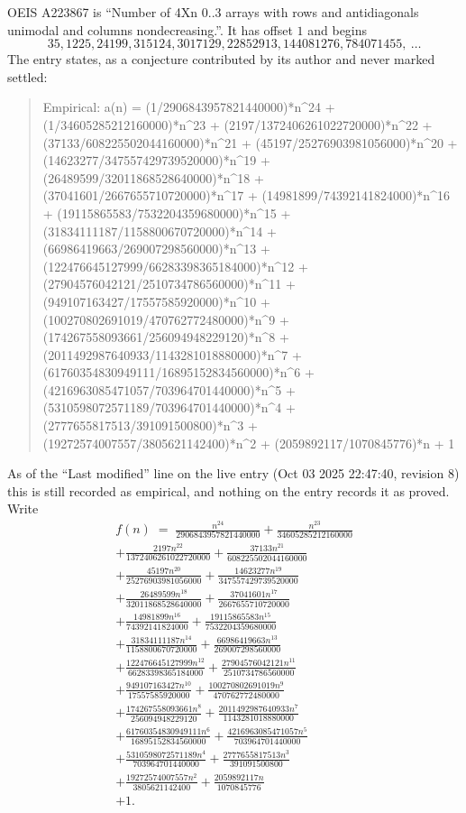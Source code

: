 \documentclass[11pt,a4paper]{article}
\theoremstyle{plain}
\theoremstyle{definition}
\begin{document}
OEIS A223867 is ``Number of 4Xn 0..3 arrays with rows and antidiagonals unimodal and columns nondecreasing.''. It has offset $1$ and begins
\[
35, 1225, 24199, 315124, 3017129, 22852913, 144081276, 784071455,\ \dots
\]
The entry states, as a conjecture contributed by its author and never marked settled:
\begin{quote}\raggedright\small
Empirical: a(n) = (1/2906843957821440000)*n\^{}24 + (1/34605285212160000)*n\^{}23 + (2197/1372406261022720000)*n\^{}22 + (37133/608225502044160000)*n\^{}21 + (45197/25276903981056000)*n\^{}20 + (14623277/347557429739520000)*n\^{}19 + (26489599/32011868528640000)*n\^{}18 + (37041601/2667655710720000)*n\^{}17 + (14981899/74392141824000)*n\^{}16 + (19115865583/7532204359680000)*n\^{}15 + (31834111187/1158800670720000)*n\^{}14 + (66986419663/269007298560000)*n\^{}13 + (122476645127999/66283398365184000)*n\^{}12 + (27904576042121/2510734786560000)*n\^{}11 + (949107163427/17557585920000)*n\^{}10 + (100270802691019/470762772480000)*n\^{}9 + (174267558093661/256094948229120)*n\^{}8 + (2011492987640933/1143281018880000)*n\^{}7 + (61760354830949111/16895152834560000)*n\^{}6 + (4216963085471057/703964701440000)*n\^{}5 + (5310598072571189/703964701440000)*n\^{}4 + (2777655817513/391091500800)*n\^{}3 + (19272574007557/3805621142400)*n\^{}2 + (2059892117/1070845776)*n + 1
\end{quote}
As of the ``Last modified'' line on the live entry (Oct 03 2025 22:47:40, revision 8) this is still
recorded as empirical, and nothing on the entry records it as proved. Write
\begin{multline*}
f(n)\;=\;\frac{n^{24}}{2906843957821440000} + \frac{n^{23}}{34605285212160000} \\
+ \frac{2197 n^{22}}{1372406261022720000} + \frac{37133 n^{21}}{608225502044160000} \\
+ \frac{45197 n^{20}}{25276903981056000} + \frac{14623277 n^{19}}{347557429739520000} \\
+ \frac{26489599 n^{18}}{32011868528640000} + \frac{37041601 n^{17}}{2667655710720000} \\
+ \frac{14981899 n^{16}}{74392141824000} + \frac{19115865583 n^{15}}{7532204359680000} \\
+ \frac{31834111187 n^{14}}{1158800670720000} + \frac{66986419663 n^{13}}{269007298560000} \\
+ \frac{122476645127999 n^{12}}{66283398365184000} + \frac{27904576042121 n^{11}}{2510734786560000} \\
+ \frac{949107163427 n^{10}}{17557585920000} + \frac{100270802691019 n^{9}}{470762772480000} \\
+ \frac{174267558093661 n^{8}}{256094948229120} + \frac{2011492987640933 n^{7}}{1143281018880000} \\
+ \frac{61760354830949111 n^{6}}{16895152834560000} + \frac{4216963085471057 n^{5}}{703964701440000} \\
+ \frac{5310598072571189 n^{4}}{703964701440000} + \frac{2777655817513 n^{3}}{391091500800} \\
+ \frac{19272574007557 n^{2}}{3805621142400} + \frac{2059892117 n}{1070845776} \\
+ 1.
\end{multline*}
\end{document}
